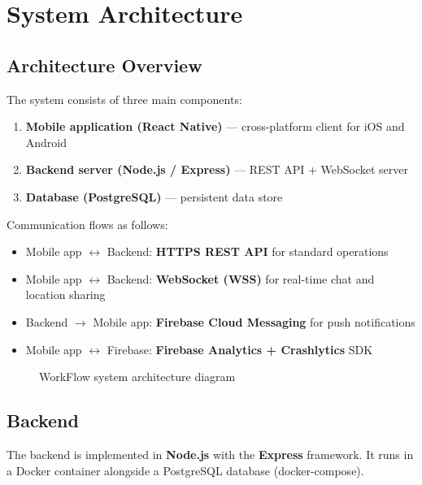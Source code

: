 \chapter{System Architecture}

\section{Architecture Overview}

The system consists of three main components:

\begin{enumerate}
  \item \textbf{Mobile application (React Native)} --- cross-platform client for iOS and Android
  \item \textbf{Backend server (Node.js / Express)} --- REST API + WebSocket server
  \item \textbf{Database (PostgreSQL)} --- persistent data store
\end{enumerate}

Communication flows as follows:
\begin{itemize}
  \item Mobile app $\leftrightarrow$ Backend: \textbf{HTTPS REST API} for standard operations
  \item Mobile app $\leftrightarrow$ Backend: \textbf{WebSocket (WSS)} for real-time chat and location sharing
  \item Backend $\rightarrow$ Mobile app: \textbf{Firebase Cloud Messaging} for push notifications
  \item Mobile app $\leftrightarrow$ Firebase: \textbf{Firebase Analytics + Crashlytics} SDK
\end{itemize}

\begin{figure}[H]
  \centering
  \caption{WorkFlow system architecture diagram}
\end{figure}

\section{Backend}

The backend is implemented in \textbf{Node.js} with the \textbf{Express} framework. It runs in a Docker container alongside a PostgreSQL database (docker-compose).

